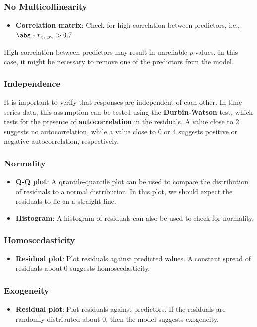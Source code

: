 \documentclass{article}
\begin{document}
\subsubsection{No Multicollinearity}
\begin{itemize}
    \item \textbf{Correlation matrix}: Check for high correlation
          between predictors, i.e., \(\abs*{r_{x_1,x_2}} > 0.7\)
\end{itemize}
High correlation between predictors may result in unreliable
\(p\)-values. In this case, it might be necessary to remove one of the
predictors from the model.
\subsubsection{Independence}
It is important to verify that responses are independent of each other.
In time series data, this assumption can be tested using the
\textbf{Durbin-Watson} test, which tests for the presence of
\textbf{autocorrelation} in the residuals. A value close to 2 suggests
no autocorrelation, while a value close to 0 or 4 suggests positive or
negative autocorrelation, respectively.
\subsubsection{Normality}
\begin{itemize}
    \item \textbf{Q-Q plot}: A quantile-quantile plot can be used to
          compare the distribution of residuals to a normal distribution.
          In this plot, we should expect the residuals to lie on a straight
          line.
    \item \textbf{Histogram}: A histogram of residuals can also be used
          to check for normality.
\end{itemize}
\subsubsection{Homoscedasticity}
\begin{itemize}
    \item \textbf{Residual plot}: Plot residuals against predicted
          values. A constant spread of residuals about 0 suggests
          homoscedasticity.
\end{itemize}
\subsubsection{Exogeneity}
\begin{itemize}
    \item \textbf{Residual plot}: Plot residuals against predictors. If
          the residuals are randomly distributed about 0, then the model
          suggests exogeneity.
\end{itemize}
\end{document}
